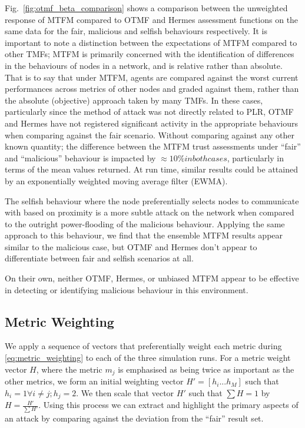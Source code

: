 \documentclass[conference]{IEEEtran}
\begin{document}
Fig.~\ref{fig:otmf_beta_comparison} shows a comparison between the unweighted response of MTFM compared to OTMF and Hermes assessment functions on the same data for the fair, malicious and selfish behaviours respectively.
It is important to note a distinction between the expectations of MTFM compared to other TMFs; MTFM is primarily concerned with the identification of differences in the behaviours of nodes in a network, and is relative rather than absolute.
That is to say that under MTFM, agents are compared against the worst current performances across metrics of other nodes and graded against them, rather than the absolute (objective) approach taken by many TMFs.
In these cases, particularly since the method of attack was not directly related to PLR, OTMF and Hermes have not registered significant activity in the appropriate behaviours when comparing against the fair scenario.
Without comparing against any other known quantity; the difference between the MTFM trust assessments under ``fair'' and ``malicious'' behaviour is impacted by $\approx 10\% in both cases$, particularly in terms of the mean values returned.
At run time, similar results could be attained by an exponentially weighted moving average filter (EWMA).

The selfish behaviour where the node preferentially selects nodes to communicate with based on proximity is a more subtle attack on the network when compared to the outright power-flooding of the malicious behaviour.
Applying the same approach to this behaviour, we find that the ensemble MTFM results appear similar to the malicious case, but OTMF and Hermes don't appear to differentiate between fair and selfish scenarios at all.

On their own, neither OTMF, Hermes, or unbiased MTFM appear to be effective in detecting or identifying malicious behaviour in this environment.


\subsection{Metric Weighting}
%

We apply a sequence of vectors that preferentially weight each metric during \eqref{eq:metric_weighting} to each of the three simulation runs.
For a metric weight vector $H$, where the metric $m_j$ is emphasised as being twice as important as the other metrics, we form an initial weighting vector $H'=[h_i...h_M]$ such that $h_i = 1 \forall i \ne j; h_j=2$. We then scale that vector $H'$ such that $\sum H = 1$ by $H= \frac{H'}{\sum H'}$.
Using this process we can extract and highlight the primary aspects of an attack by comparing against the deviation from the ``fair'' result set. 
\end{document}
